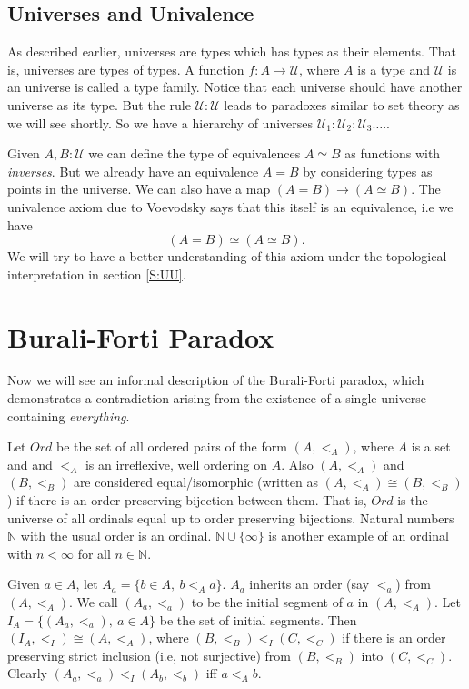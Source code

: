 \documentclass[10pt]{article}
\theoremstyle{definition}
\theoremstyle{plain}
\theoremstyle{remark}
\newcommand{\U}{\mathscr{U}}
\begin{document}
\subsection{Universes and Univalence}

As described earlier, universes are types which has types as their elements. That is, universes
are types of types. A function $f : A \to \U$, where $A$ is a type and $\U$ is an universe
is called a type family. Notice that each universe should have another universe as its type.
But the rule $\U : \U$ leads to paradoxes similar to set theory as we will see shortly. 
So we have a hierarchy of universes $\U_1 : \U_2 : \U_3 \dots $.\smallskip.

Given $A, B:\U$ we can define the type of equivalences $A\simeq B$ as functions
with \emph{inverses}. But we already have an equivalence $A = B$ by considering types as points
in the universe. We can also have a map $(A = B) \to (A \simeq B)$. The univalence axiom 
due to Voevodsky says that this itself is an equivalence, i.e we have
\[ (A = B) \simeq (A \simeq B).\]
We will try to have a better understanding of this axiom under the topological interpretation
in section \ref{S:UU}.

\section{Burali-Forti Paradox}\label{S:BFP}

Now we will see an informal description of the Burali-Forti paradox, which demonstrates a
contradiction arising from the existence of a single universe containing 
\emph{everything}.\smallskip

Let $Ord$ be the set of all ordered pairs of the form $(A, <_A)$, where $A$ is a set and
and $<_A$ is an irreflexive, well ordering on $A$. Also $(A, <_A)$ and $(B, <_B)$ are 
considered equal/isomorphic (written as $(A,<_A) \cong (B,<_B)$) if there is an order 
preserving bijection between them. That is, $Ord$ is the universe of all ordinals equal up to 
order preserving bijections. Natural numbers $\mathbb{N}$ with the usual order is an ordinal.
$\mathbb{N}\cup \{\infty \}$ is another example of an ordinal with $n < \infty$ for all
$n \in \mathbb{N}$.\smallskip

Given $a\in A$, let $A_a = \{b \in A,\ b <_A a \}$. $A_a$ inherits an order (say $<_a$)
from $(A, <_A)$. We call $(A_a, <_a)$ to be the initial segment of $a$ in $(A, <_A)$. Let
$I_A = \{(A_a, <_a),\ a\in A\}$ be the set of initial segments. Then 
$(I_A,<_I) \cong (A, <_A)$, where ${ (B,<_B) <_I (C,<_C) }$ if there is an order preserving 
strict inclusion (i.e, not surjective) from $(B,<_B)$ into $(C,<_C)$. Clearly 
$(A_a,<_a) <_I (A_b,<_b)$ iff $a <_A b$.\smallskip
\end{document}
